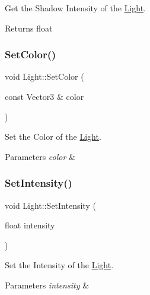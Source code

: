 Get the Shadow Intensity of the \hyperlink{classLight}{Light}. 

\begin{DoxyReturn}{Returns}
float 
\end{DoxyReturn}
\mbox{\label{classLight_a1930e36520d82d4d82779c66bba28734}} 
\subsubsection{\texorpdfstring{Set\+Color()}{SetColor()}}
{\footnotesize\ttfamily void Light\+::\+Set\+Color (\begin{DoxyParamCaption}\item[{const Vector3 \&}]{color }\end{DoxyParamCaption})\hspace{0.3cm}{\ttfamily [inline]}}



Set the Color of the \hyperlink{classLight}{Light}. 


\begin{DoxyParams}{Parameters}
{\em color} & \\
\hline
\end{DoxyParams}
\mbox{\label{classLight_a13d3927b9123987a5151f63d5d4c3fc4}} 
\subsubsection{\texorpdfstring{Set\+Intensity()}{SetIntensity()}}
{\footnotesize\ttfamily void Light\+::\+Set\+Intensity (\begin{DoxyParamCaption}\item[{float}]{intensity }\end{DoxyParamCaption})\hspace{0.3cm}{\ttfamily [inline]}}



Set the Intensity of the \hyperlink{classLight}{Light}. 


\begin{DoxyParams}{Parameters}
{\em intensity} & \\
\hline
\end{DoxyParams}
\mbox{\label{classLight_a9163be3eb36a2bee3d80664afff48a6a}} 
